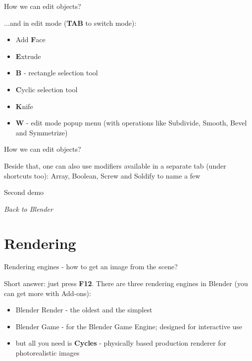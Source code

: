 \documentclass{beamer}
\begin{document}
\begin{frame}{How we can edit objects?}

...and in edit mode (\textbf{TAB} to switch mode):
\begin{itemize}
\item Add \textbf{F}ace
\item \textbf{E}xtrude
\item \textbf{B} - rectangle selection tool
\item \textbf{C}yclic selection tool
\item \textbf{K}nife
\item \textbf{W} - edit mode popup menu (with operations like Subdivide, Smooth, Bevel and Symmetrize)

\end{itemize}

\end{frame}

\begin{frame}{How we can edit objects?}

\centering \Large
{Beside that, one can also use modifiers available in a separate tab (under shortcuts too): Array, Boolean, Screw and Soldify to name a few}

\end{frame}

\begin{frame}{Second demo}

\centering \Huge
\emph{Back to Blender}

\end{frame}

\section{Rendering}

\begin{frame}{Rendering engines - how to get an image from the scene?}

Short answer: just press \textbf{F12}. There are three rendering engines in 
Blender (you can get more with Add-ons):
\begin{itemize}
\item Blender Render - the oldest and the simplest
\item Blender Game - for the Blender Game Engine; designed for interactive use
\item but all you need is \textbf{Cycles} - physically based 
production renderer for photorealistic images
\end{itemize}

\end{frame}
\end{document}
